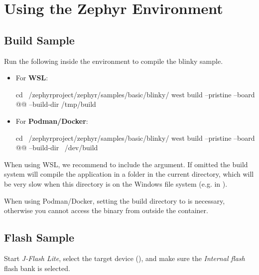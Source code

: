 \section{Using the Zephyr Environment}
\label{usingenv}

\subsection{Build Sample}

Run the following inside the environment to compile the blinky sample.

\begin{itemize}
  \item For \textbf{WSL}:
  \begin{monobox}
cd ~/zephyrproject/zephyr/samples/basic/blinky/
west build --pristine --board @\board{}@ --build-dir /tmp/build
\end{monobox}
  \item For \textbf{Podman/Docker}:
  \begin{monobox}
cd ~/zephyrproject/zephyr/samples/basic/blinky/
west build --pristine --board @\board{}@ --build-dir ~/dev/build
\end{monobox}
\end{itemize}

\begin{infobox}
  When using WSL, we recommend to include the  argument.
  If omitted the build system will compile the application in a  folder in the current directory, which will be very slow when this directory is on the Windows file system (e.g. in ).
\end{infobox}

\begin{infobox}
  When using Podman/Docker, setting the build directory to  is necessary, otherwise you cannot access the binary from outside the container.
\end{infobox}


\newpage

\subsection{Flash Sample}

Start \emph{J-Flash Lite}, select the target device (\texttt{\mcu}), and make sure the \emph{Internal flash} flash bank is selected.

